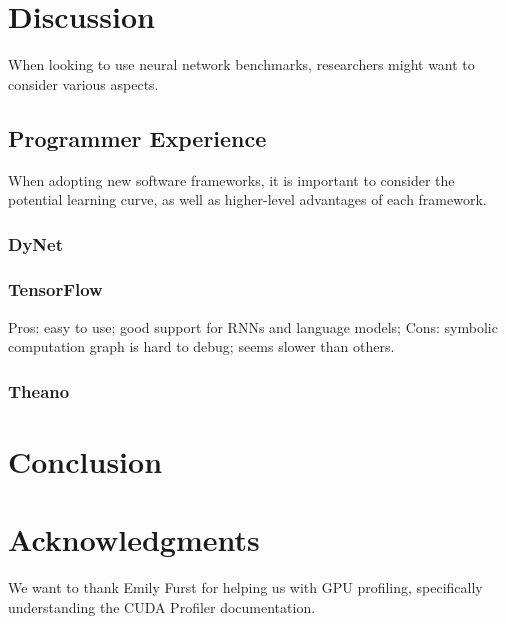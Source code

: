 \documentclass{article}
\begin{document}
\section{Discussion}
When looking to use neural network benchmarks, researchers might want to consider various aspects.
\subsection{Programmer Experience}
When adopting new software frameworks, it is important to consider the potential learning curve, as well as higher-level advantages of each framework.
\subsubsection{DyNet}

\subsubsection{TensorFlow}
Pros: easy to use; good support for RNNs and language models; 
Cons: symbolic computation graph is hard to debug; seems slower than others.
\subsubsection{Theano}
\section{Conclusion}


\section*{Acknowledgments}
We want to thank Emily Furst for helping us with GPU profiling, specifically understanding the CUDA Profiler documentation.
\newpage


\end{document}
